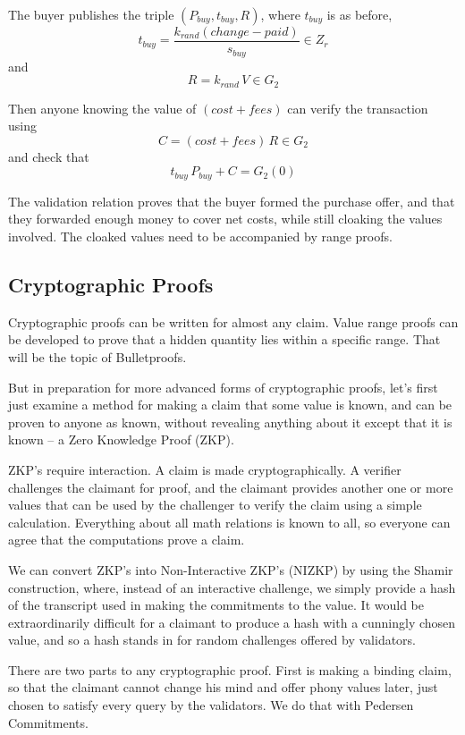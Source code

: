 \documentclass{yellowpaper}
\begin{document}
The buyer publishes the triple $(P_{buy}, t_{buy}, R)$, where $t_{buy}$ is as before,
$$t_{buy} = \frac{k_{rand} (change - paid)}{s_{buy}} \in Z_r$$
and
$$R = k_{rand}\, V \in G_2$$

Then anyone knowing the value of $(cost + fees)$ can verify the transaction using
$$C = (cost + fees) \, R \in G_2$$
and check that
$$t_{buy}\, P_{buy} + C = G_2(0)$$

The validation relation proves that the buyer formed the purchase offer, and that they forwarded enough money to cover net costs, while still cloaking the values involved. The cloaked values need to be accompanied by range proofs.

\subsection{Cryptographic Proofs}
Cryptographic proofs can be written for almost any claim. Value range proofs can be developed to prove that a hidden quantity lies within a specific range. That will be the topic of Bulletproofs. 

But in preparation for more advanced forms of cryptographic proofs, let's first just examine a method for making a claim that some value is known, and can be proven to anyone as known, without  revealing anything about it except that it is known -- a Zero Knowledge Proof (ZKP).

ZKP's require interaction. A claim is made cryptographically. A verifier challenges the claimant for proof, and the claimant provides another one or more values that can be used by the challenger to verify the claim using a simple calculation. Everything about all math relations is known to all, so everyone can agree that the computations prove a claim.

We can convert ZKP's  into Non-Interactive ZKP's (NIZKP)
 by using the Shamir construction, where, instead of an interactive challenge, we simply provide a hash of the transcript used in making the commitments to the value. It would be extraordinarily difficult for a claimant to produce a hash with a cunningly chosen value, and so a hash stands in for random challenges offered by validators.

There are two parts to any cryptographic proof. First is making a binding claim, so that the claimant cannot change his mind and offer phony values later, just chosen to satisfy every query by the validators. We do that with Pedersen Commitments. 
\end{document}

